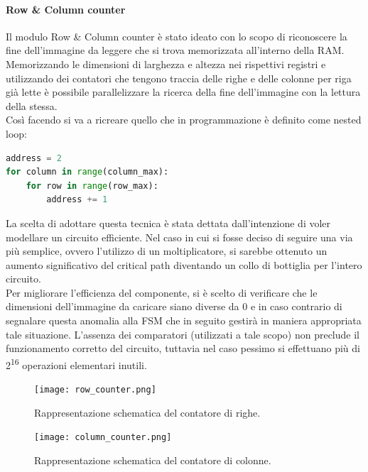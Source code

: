 \paragraph{Row \& Column counter\\}

Il modulo Row \& Column counter è stato ideato con lo scopo di riconoscere la fine dell'immagine da leggere che si trova memorizzata all'interno della RAM.\\
Memorizzando le dimensioni di larghezza e altezza nei rispettivi registri e utilizzando dei contatori che tengono traccia delle righe e delle colonne per riga già lette è possibile parallelizzare la ricerca della fine dell'immagine con la lettura della stessa.\\
Così facendo si va a ricreare quello che in programmazione è definito come nested loop:

\begin{lstlisting}[language=Python, caption={Nested loop in pseudocodice.},captionpos=b]
address = 2
for column in range(column_max):
    for row in range(row_max):
        address += 1
\end{lstlisting}

La scelta di adottare questa tecnica è stata dettata dall'intenzione di voler modellare un circuito efficiente. Nel caso in cui si fosse deciso di seguire una via più semplice, ovvero l'utilizzo di un moltiplicatore, si sarebbe ottenuto un aumento significativo del critical path diventando un collo di bottiglia per l'intero circuito.\\
Per migliorare l'efficienza del componente, si è scelto di verificare che le dimensioni dell'immagine da caricare siano diverse da 0 e in caso contrario di segnalare questa anomalia alla FSM che in seguito gestirà in maniera appropriata tale situazione. L'assenza dei comparatori (utilizzati a tale scopo) non preclude il funzionamento corretto del circuito, tuttavia nel caso pessimo si effettuano più di 2\textsuperscript{16} operazioni elementari inutili.

\begin{figure}[h!]
\centering
\texttt{[image: row\_counter.png]}%
\caption{Rappresentazione schematica del contatore di righe.}
\end{figure}
\begin{figure}[h!]
\centering
\texttt{[image: column\_counter.png]} %
\caption{Rappresentazione schematica del contatore di colonne.}
\end{figure}

